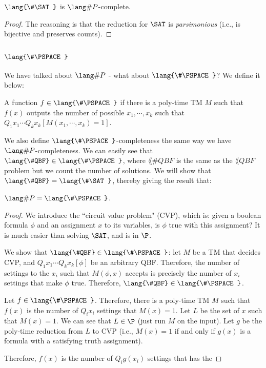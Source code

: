 \newcommand{\SharpSAT}{\lang{\#\SAT}}
\begin{theorem}
$\SharpSAT$ is $\SharpP$-complete.
\end{theorem}

\begin{proof}
The reasoning is that the reduction for $\SAT$ is \emph{parsimonious} (i.e., is bijective and preserves counts). 
\end{proof}

\newcommand{\SharpPSPACE}{\lang{\#\PSPACE}}
\subsection{$\SharpPSPACE$}
We have talked about $\SharpP$ - what about $\SharpPSPACE$? We define it below:
\begin{definition}
A function $f \in \SharpPSPACE$ if there is a poly-time TM $M$ such that $f(x)$ outputs the number of possible $x_1, \cdots, x_k$ such that $Q_1x_1 \cdots Q_kx_k [M(x_1, \cdots, x_k) = 1]$. 
\end{definition}
\newcommand{\SharpQBF}{\lang{\#QBF}}
We also define $\SharpPSPACE$-completeness the same way we have $\SharpP$-completeness. We can easily see that $\SharpQBF \in \SharpPSPACE$, where $\SharpQBF$ is the same as the $\lang{QBF}$ problem but we count the number of solutions. We will show that $\SharpQBF = \SharpSAT$, thereby giving the result that:
\begin{theorem}
$\SharpP = \SharpPSPACE$.
\end{theorem}

\begin{proof}
We introduce the ``circuit value problem" (CVP), which is: given a boolean formula $\phi$ and an assignment $x$ to its variables, is $\phi$ true with this assignment? It is much easier than solving $\SAT$, and is in $\P$. 

\par We show that $\SharpQBF \in \SharpPSPACE$: let $M$ be a TM that decides CVP, and $Q_1x_1 \cdots Q_kx_k [\phi]$ be an arbitrary QBF. Therefore, the number of settings to the $x_i$ such that $M(\phi, x)$ accepts is precisely the number of $x_i$ settings that make $\phi$ true. Therefore, $\SharpQBF \in \SharpPSPACE$.

\par Let $f \in \SharpPSPACE$. Therefore, there is a poly-time TM $M$ such that $f(x)$ is the number of $Q_ix_i$ settings that $M(x) = 1$. Let $L$ be the set of $x$ such that $M(x) = 1$. We can see that $L \in \P$ (just run $M$ on the input). Let $g$ be the poly-time reduction from $L$ to CVP (i.e., $M(x) = 1$ if and only if $g(x)$ is a formula with a satisfying truth assignment). 

\par Therefore, $f(x)$ is the number of $Q_ig(x_i)$ settings that has the 
\end{proof}

